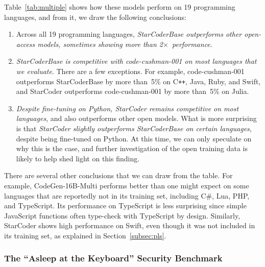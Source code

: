 \documentclass[10pt]{article} %
\newcommand{\cpp}{C\texttt{++}}
\begin{document}
Table~\ref{tab:multiple} shows how these models perform on 19 programming languages, and from it, we draw the following conclusions:

\begin{enumerate}

  \item Across all 19 programming languages, \emph{StarCoderBase outperforms other open-access models, sometimes showing more than 2$\times$~performance}.

  \item \emph{StarCoderBase is competitive with code-cushman-001 on most languages that we evaluate}. There are a few exceptions. For example, code-cushman-001 outperforms StarCoderBase by more than~5\% on \cpp{}, Java, Ruby, and Swift, and StarCoder outperforms code-cushman-001 by more than~5\% on Julia.

  \item \emph{Despite fine-tuning on Python, StarCoder remains competitive on most languages}, and also outperforms other open models. What is more surprising is that \emph{StarCoder slightly outperforms StarCoderBase on certain languages}, despite being fine-tuned on Python. At this time, we can only speculate on why this is the case, and further investigation of the open training data is likely to help shed light on this finding.

\end{enumerate}

There are several other conclusions that we can draw from the table. For example, CodeGen-16B-Multi performs better than one might expect on some languages that are reportedly not in its training set, including C\#, Lua, PHP, and TypeScript. Its performance on TypeScript is less surprising since simple JavaScript functions often type-check with TypeScript by design. Similarly, StarCoder shows high performance on Swift, even though it was not included in its training set, as explained in Section~\ref{subsec:pls}.

\subsubsection{The ``Asleep at the Keyboard'' Security Benchmark}
\end{document}
